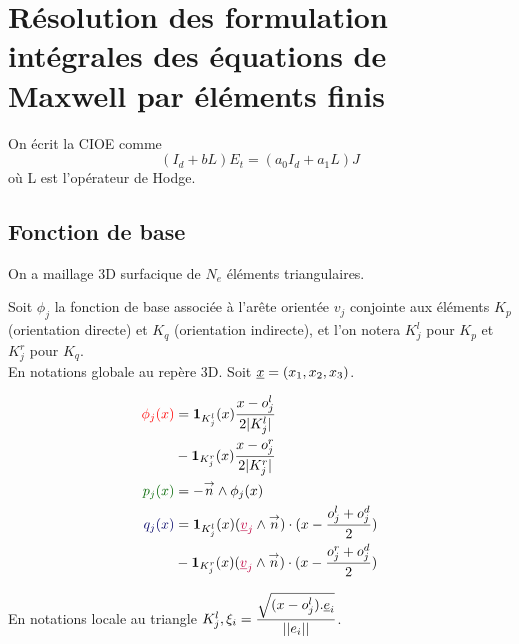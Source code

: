 \section{Résolution des formulation intégrales des équations de Maxwell par éléments finis}
On écrit la CIOE comme
\[
  (I_d + bL)E_t = (a_0I_d+a_1L)J
\]
où L est l'opérateur de Hodge.
\subsection{Fonction de base}
On a maillage 3D surfacique de $N_e$ éléments triangulaires.

Soit $\phi_j$ la fonction de base associée à l’arête orientée $v_j$ conjointe aux éléments $K_p$ (orientation directe) et $K_q$ (orientation indirecte), et l'on notera $K_j^l$ pour $K_p$ et $K_j^r$ pour $K_q$.\\

En notations globale au repère 3D. 
Soit $\v x = (x_1,x_2,x_3)$.


\begin{minipage}{0.4\textwidth}
\begin{align*}
	\color{red}{\phi_j(x)} &= \mathbf{1}_{K_j^l}(x)\frac{x-o_j^l}{2|K_j^l|} \\&- \mathbf{1}_{K_j^r}(x)\frac{x-o_j^r}{2|K_j^r|}\\
	\color{black!60!green}{p_j(x)} &= -\vn \pvect \phi_j(x)\\
	\color{black!60!blue}{q_j(x)} &= \mathbf{1}_{K_j^l}(x) ( { \color{purple}{\v v_j } } \pvect \vn ) \cdot ( x - \frac{o^l_j + o^d_j}{2} ) \\
 &- \mathbf{1}_{K_j^r}(x) ( { \color{purple}{\v v_j } } \pvect \vn ) \cdot ( x - \frac{o^r_j + o^d_j}{2} )
\end{align*}
\end{minipage}
\begin{minipage}{0.58\textwidth}
	\centering
	\begin{tikzpicture}[scale=2.5]
	
	\end{tikzpicture}
\end{minipage} 

En notations locale au triangle $K_j^l, \xi_i = \frac{\sqrt{(x-o^l_j).\v e_i}}{||e_i||}$.

